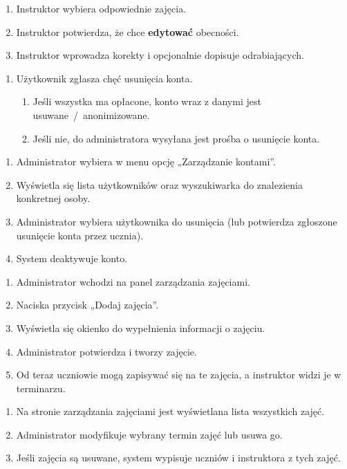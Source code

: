 \documentclass{article}
\begin{document}
\begin{enumerate}
    \item Instruktor wybiera odpowiednie zajęcia.
    \item Instruktor potwierdza, że chce \textbf{edytować} obecności.
    \item Instruktor wprowadza korekty i opcjonalnie dopisuje odrabiających.
\end{enumerate}


\begin{enumerate}
    \item Użytkownik zgłasza chęć usunięcia konta.
    \begin{enumerate}
        \item Jeśli wszystka ma opłacone, konto wraz z danymi jest usuwane~/~anonimizowane.
        \item Jeśli nie, do administratora wysyłana jest prośba o usunięcie konta.
    \end{enumerate}
\end{enumerate}

\begin{enumerate}
    \item Administrator wybiera w menu opcję „Zarządzanie kontami”.
    \item Wyświetla się lista użytkowników oraz wyszukiwarka do znalezienia konkretnej osoby.
    \item Administrator wybiera użytkownika do usunięcia (lub potwierdza zgłoszone usunięcie konta przez ucznia).
    \item System deaktywuje konto.
\end{enumerate}

\begin{enumerate}
    \item Administrator wchodzi na panel zarządzania zajęciami.
    \item Naciska przycisk „Dodaj zajęcia”.
    \item Wyświetla się okienko do wypełnienia informacji o zajęciu.
    \item Administrator potwierdza i tworzy zajęcie.
    \item Od teraz uczniowie mogą zapisywać się na te zajęcia, a instruktor widzi je w terminarzu.
\end{enumerate}


\begin{enumerate}
    \item Na stronie zarządzania zajęciami jest wyświetlana lista wszystkich zajęć.
    \item Administrator modyfikuje wybrany termin zajęć lub usuwa go.
    \item Jeśli zajęcia są usuwane, system wypisuje uczniów i instruktora z tych zajęć.
\end{enumerate}
\end{document}

